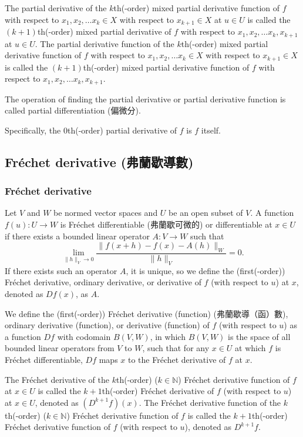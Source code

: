 \documentclass[a4paper,12pt]{report}
\begin{document}
\begin{itemize}
\begin{itemize}
The partial derivative of the $k$th(-order) mixed partial derivative function of $f$ with respect to $ x_1, x_2,\dots  x_k\in X$ with respect to $ x_{k+1}\in X$ at $u\in U$ is called the $(k+1)$th(-order) mixed partial derivative of $f$ with respect to $ x_1, x_2,\dots  x_k, x_{k+1}$ at $u\in U$. The partial derivative function of the $k$th(-order) mixed partial derivative function of $f$ with respect to $ x_1, x_2,\dots  x_k\in X$ with respect to $ x_{k+1}\in X$ is called the $(k+1)$th(-order) mixed partial derivative function of $f$ with respect to $ x_1, x_2,\dots  x_k, x_{k+1}$.

The operation of finding the partial derivative or partial derivative function is called partial differentiation (偏微分).

Specifically, the $0$th(-order) partial derivative of $f$ is $f$ itself.
\subsection{Fréchet derivative (弗蘭歇導數)}
\subsubsection{Fréchet derivative}
Let $V$ and $W$ be normed vector spaces and $U$ be an open subset of $V$. A function $f(u)\colon U\to W$ is Fréchet differentiable (弗蘭歇可微的) or differentiable at $x\in U$ if there exists a bounded linear operator $A\colon V\to W$ such that
\[\lim_{\|h\|_V\to 0}\frac{\|f(x+h)-f(x)-A(h)\|_W}{\|h\|_V}=0.\]
If there exists such an operator $A$, it is unique, so we define the (first(-order)) Fréchet derivative, ordinary derivative, or derivative of $f$ (with respect to $u$) at $x$, denoted as $Df(x)$, as $A$.

We define the (first(-order)) Fréchet derivative (function) (弗蘭歇導（函）數), ordinary derivative (function), or derivative (function) of $f$ (with respect to $u$) as a function $Df$ with codomain $B(V,W)$, in which $B(V,W)$ is the space of all bounded linear operators from $V$ to $W$, such that for any $x\in U$ at which $f$ is Fréchet differentiable, $Df$ maps $x$ to the Fréchet derivative of $f$ at $x$.

The Fréchet derivative of the $k$th(-order) ($k\in\mathbb{N}$) Fréchet derivative function of $f$ at $x\in U$ is called the $k+1$th(-order) Fréchet derivative of $f$ (with respect to $u$) at $x\in U$, denoted as $(D^{k+1}f)(x)$. The Fréchet derivative function of the $k$th(-order) ($k\in\mathbb{N}$) Fréchet derivative function of $f$ is called the $k+1$th(-order) Fréchet derivative function of $f$ (with respect to $u$), denoted as $D^{k+1}f$.


\end{itemize}
\end{itemize}
\end{document}
